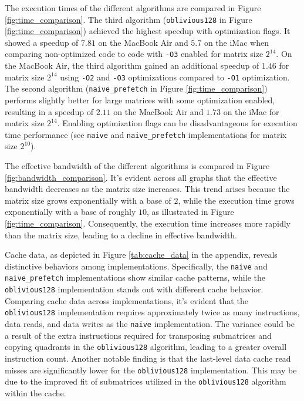 \documentclass[conference]{IEEEtran}
\begin{document}
    The execution times of the different algorithms are compared in Figure \ref{fig:time_comparison}.
    The third algorithm (\texttt{oblivious128} in Figure \ref{fig:time_comparison}) achieved the highest speedup with optimization flags. It showed a speedup of $7.81$ on the MacBook Air and $5.7$ on the iMac when comparing non-optimized code to code with \texttt{-O3} enabled for matrix size $2^{14}$.
    On the MacBook Air, the third algorithm gained an additional speedup of $1.46$ for matrix size $2^{14}$ using \texttt{-O2} and \texttt{-O3} optimizations compared to \texttt{-O1} optimization.
    The second algorithm (\texttt{naive\_prefetch} in Figure \ref{fig:time_comparison}) performs slightly better for large matrices with some optimization enabled, resulting in a speedup of $2.11$ on the MacBook Air and $1.73$ on the iMac for matrix size $2^{14}$.
    Enabling optimization flags can be disadvantageous for execution time performance (see \texttt{naive} and \texttt{naive\_prefetch} implementations for matrix size $2^{10}$).

    The effective bandwidth of the different algorithms is compared in Figure \ref{fig:bandwidth_comparison}. It's evident across all graphs that the effective bandwidth decreases as the matrix size increases. This trend arises because the matrix size grows exponentially with a base of $2$, while the execution time grows exponentially with a base of roughly $10$, as illustrated in Figure \ref{fig:time_comparison}. Consequently, the execution time increases more rapidly than the matrix size, leading to a decline in effective bandwidth.

    Cache data, as depicted in Figure \ref{tab:cache_data} in the appendix, reveals distinctive behaviors among implementations. Specifically, the \texttt{naive} and \texttt{naive\_prefetch} implementations show similar cache patterns, while the \texttt{oblivious128} implementation stands out with different cache behavior. Comparing cache data across implementations, it's evident that the \texttt{oblivious128} implementation requires approximately twice as many instructions, data reads, and data writes as the \texttt{naive} implementation. The variance could be a result of the extra instructions required for transposing submatrices and copying quadrants in the \texttt{oblivious128} algorithm, leading to a greater overall instruction count. Another notable finding is that the last-level data cache read misses are significantly lower for the \texttt{oblivious128} implementation. This may be due to the improved fit of submatrices utilized in the \texttt{oblivious128} algorithm within the cache.
\end{document}
